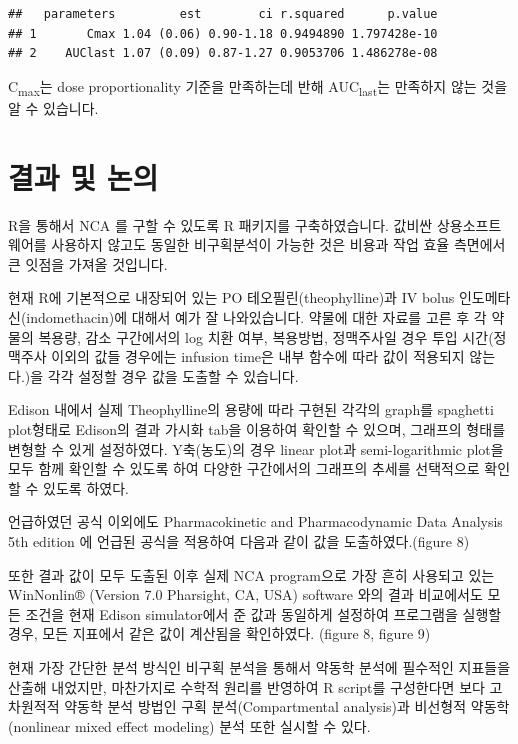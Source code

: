 \documentclass[12pt,]{krantz}
\theoremstyle{definition}
\theoremstyle{definition}
\theoremstyle{definition}
\theoremstyle{remark}
\begin{document}
\begin{verbatim}
##   parameters         est        ci r.squared      p.value
## 1       Cmax 1.04 (0.06) 0.90-1.18 0.9494890 1.797428e-10
## 2    AUClast 1.07 (0.09) 0.87-1.27 0.9053706 1.486278e-08
\end{verbatim}

C\textsubscript{max}는 dose proportionality 기준을 만족하는데 반해
AUC\textsubscript{last}는 만족하지 않는 것을 알 수 있습니다.

\chapter{결과 및 논의}\label{result}

R을 통해서 NCA 를 구할 수 있도록 R 패키지를 구축하였습니다. 값비싼
상용소프트웨어를 사용하지 않고도 동일한 비구획분석이 가능한 것은 비용과
작업 효율 측면에서 큰 잇점을 가져올 것입니다.

현재 R에 기본적으로 내장되어 있는 PO 테오필린(theophylline)과 IV bolus
인도메타신(indomethacin)에 대해서 예가 잘 나와있습니다. 약물에 대한
자료를 고른 후 각 약물의 복용량, 감소 구간에서의 log 치환 여부,
복용방법, 정맥주사일 경우 투입 시간(정맥주사 이외의 값들 경우에는
infusion time은 내부 함수에 따라 값이 적용되지 않는다.)을 각각 설정할
경우 값을 도출할 수 있습니다.

Edison 내에서 실제 Theophylline의 용량에 따라 구현된 각각의 graph를
spaghetti plot형태로 Edison의 결과 가시화 tab을 이용하여 확인할 수
있으며, 그래프의 형태를 변형할 수 있게 설정하였다. Y축(농도)의 경우
linear plot과 semi-logarithmic plot을 모두 함께 확인할 수 있도록 하여
다양한 구간에서의 그래프의 추세를 선택적으로 확인할 수 있도록 하였다.

언급하였던 공식 이외에도 Pharmacokinetic and Pharmacodynamic Data
Analysis 5th edition 에 언급된 공식을 적용하여 다음과 같이 값을
도출하였다.(figure 8)

또한 결과 값이 모두 도출된 이후 실제 NCA program으로 가장 흔히 사용되고
있는 WinNonlin® (Version 7.0 Pharsight, CA, USA) software 와의 결과
비교에서도 모든 조건을 현재 Edison simulator에서 준 값과 동일하게
설정하여 프로그램을 실행할 경우, 모든 지표에서 같은 값이 계산됨을
확인하였다. (figure 8, figure 9)

현재 가장 간단한 분석 방식인 비구획 분석을 통해서 약동학 분석에 필수적인
지표들을 산출해 내었지만, 마찬가지로 수학적 원리를 반영하여 R script를
구성한다면 보다 고차원적적 약동학 분석 방법인 구획 분석(Compartmental
analysis)과 비선형적 약동학(nonlinear mixed effect modeling) 분석 또한
실시할 수 있다.
\end{document}
